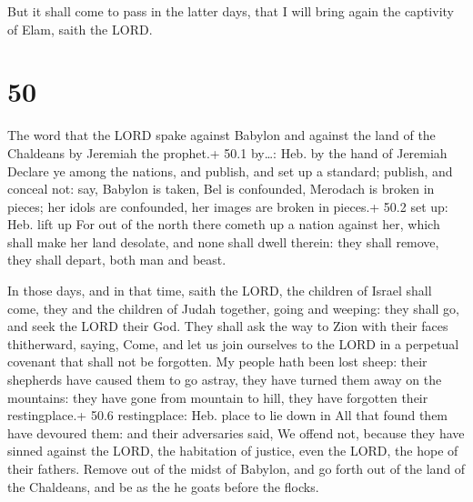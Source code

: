  But it shall come to pass in the latter days, that I
will bring again the captivity of Elam, saith the LORD.

\hypertarget{section-49}{%
\section{50}\label{section-49}}

 The word that the LORD spake against Babylon and against
the land of the Chaldeans by Jeremiah the prophet.+ 50.1 by\ldots: Heb.
by the hand of Jeremiah  Declare ye among the nations, and
publish, and set up a standard; publish, and conceal not: say, Babylon
is taken, Bel is confounded, Merodach is broken in pieces; her idols are
confounded, her images are broken in pieces.+ 50.2 set up: Heb. lift up
 For out of the north there cometh up a nation against her,
which shall make her land desolate, and none shall dwell therein: they
shall remove, they shall depart, both man and beast.

 In those days, and in that time, saith the LORD, the
children of Israel shall come, they and the children of Judah together,
going and weeping: they shall go, and seek the LORD their God.
 They shall ask the way to Zion with their faces
thitherward, saying, Come, and let us join ourselves to the LORD in a
perpetual covenant that shall not be forgotten.  My people
hath been lost sheep: their shepherds have caused them to go astray,
they have turned them away on the mountains: they have gone from
mountain to hill, they have forgotten their restingplace.+ 50.6
restingplace: Heb. place to lie down in  All that found them
have devoured them: and their adversaries said, We offend not, because
they have sinned against the LORD, the habitation of justice, even the
LORD, the hope of their fathers.  Remove out of the midst of
Babylon, and go forth out of the land of the Chaldeans, and be as the he
goats before the flocks.

